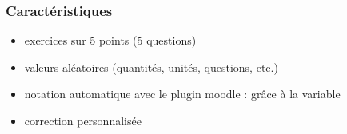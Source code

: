 \documentclass[letterpaper,10pt,french]{sphinxmanual}
\begin{document}
\subsubsection{Caractéristiques}
\label{\detokenize{geom-vecteur:caracteristiques}}\begin{itemize}
\item {} 
exercices sur 5 points (5 questions)

\item {} 
valeurs aléatoires (quantités, unités, questions, etc.)

\item {} 
notation automatique avec le plugin moodle : grâce à la variable 

\item {} 
correction personnalisée

\end{itemize}



\renewcommand{\indexname}{Index}
\printindex
\end{document}
